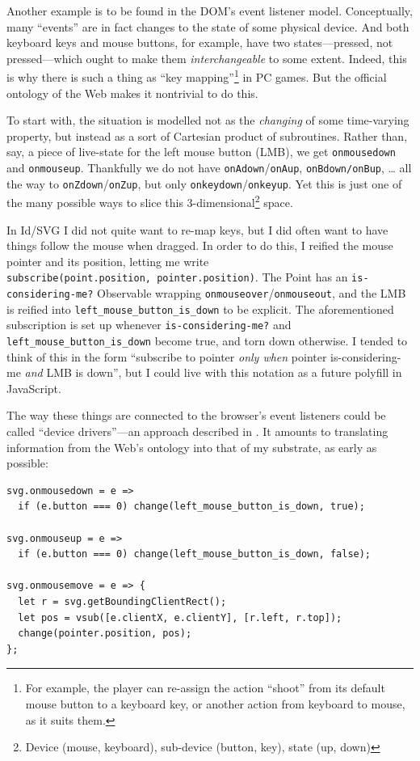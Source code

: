 Another example is to be found in the DOM's event listener model.
Conceptually, many ``events'' are in fact changes to the state of some
physical device. And both keyboard keys and mouse buttons, for example,
have two states---pressed, not pressed---which ought to make them
\emph{interchangeable} to some extent. Indeed, this is why there is such
a thing as ``key mapping''\footnote{For example, the player can
  re-assign the action ``shoot'' from its default mouse button to a
  keyboard key, or another action from keyboard to mouse, as it suits
  them.} in PC games. But the official ontology of the Web makes it
nontrivial to do this.

To start with, the situation is modelled not as the \emph{changing} of
some time-varying property, but instead as a sort of Cartesian product
of subroutines. Rather than, say, a piece of live-state for the left
mouse button (LMB), we get \texttt{onmousedown} and \texttt{onmouseup}.
Thankfully we do not have \texttt{onAdown}/\texttt{onAup},
\texttt{onBdown/onBup}, \ldots{} all the way to
\texttt{onZdown}/\texttt{onZup}, but only
\texttt{onkeydown}/\texttt{onkeyup}. Yet this is just one of the many
possible ways to slice this 3-dimensional\footnote{Device (mouse,
  keyboard), sub-device (button, key), state (up, down)} space.

In Id{}/SVG I did not quite want to re-map keys, but I did often want to
have things follow the mouse when dragged. In order to do this, I
reified the mouse pointer and its position, letting me write
\texttt{subscribe(point.position,\ pointer.position)}. The Point has an
\texttt{is-considering-me?} Observable wrapping
\texttt{onmouseover}/\texttt{onmouseout}, and the LMB is reified into
\texttt{left\_mouse\_button\_is\_down} to be explicit. The
aforementioned subscription is set up whenever
\texttt{is-considering-me?} and \texttt{left\_mouse\_button\_is\_down}
become true, and torn down otherwise. I tended to think of this in the
form ``subscribe to pointer \emph{only when} pointer is-considering-me
\emph{and} LMB is down'', but I could live with this notation as a
future polyfill in JavaScript.

The way these things are connected to the browser's event listeners
could be called ``device drivers''---an approach described in
\cite{prog21-bbox}. It amounts to translating information from the Web's
ontology into that of my substrate, as early as possible:

\begin{lstlisting}
svg.onmousedown = e =>
  if (e.button === 0) change(left_mouse_button_is_down, true);

svg.onmouseup = e =>
  if (e.button === 0) change(left_mouse_button_is_down, false);

svg.onmousemove = e => {
  let r = svg.getBoundingClientRect();
  let pos = vsub([e.clientX, e.clientY], [r.left, r.top]);
  change(pointer.position, pos);
};
\end{lstlisting}

